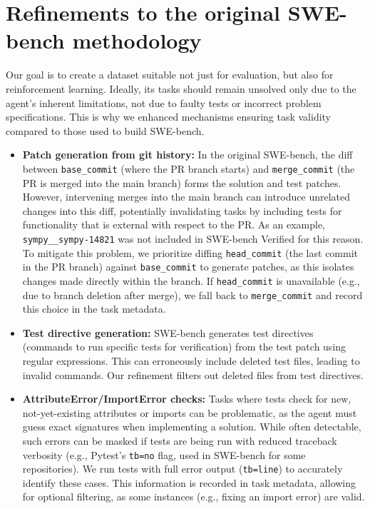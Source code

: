 \documentclass[dandb]{article}
\begin{document}
\section{Refinements to the original SWE-bench methodology}
\label{sec:list_of_refinements}

Our goal is to create a dataset suitable not just for evaluation, but also for reinforcement learning. Ideally, its tasks should remain unsolved only due to the agent's inherent limitations, not due to faulty tests or incorrect problem specifications. This is why we enhanced mechanisms ensuring task validity compared to those used to build SWE-bench.

\begin{itemize}
    \item \textbf{Patch generation from git history:} In the original SWE-bench, the diff between \verb|base_commit| (where the PR branch starts) and \verb|merge_commit| (the PR is merged into the main branch) forms the solution and test patches. However, intervening merges into the main branch can introduce unrelated changes into this diff, potentially invalidating tasks by including tests for functionality that is external with respect to the PR. As an example, \texttt{sympy\_\_sympy-14821} was not included in SWE-bench Verified for this reason. To mitigate this problem, we prioritize diffing \verb|head_commit| (the last commit in the PR branch) against \verb|base_commit| to generate patches, as this isolates changes made directly within the branch. If \verb|head_commit| is unavailable (e.g., due to branch deletion after merge), we fall back to \verb|merge_commit| and record this choice in the task metadata.

    \item \textbf{Test directive generation:} SWE-bench generates test directives (commands to run specific tests for verification) from the test patch using regular expressions. This can erroneously include deleted test files, leading to invalid commands. Our refinement filters out deleted files from test directives.

    \item \textbf{AttributeError/ImportError checks:} Tasks where tests check for new, not-yet-existing attributes or imports can be problematic, as the agent must guess exact signatures when implementing a solution. While often detectable, such errors can be masked if tests are being run with reduced traceback verbosity (e.g., Pytest's \texttt{tb=no} flag, used in SWE-bench for some repositories). We run tests with full error output (\texttt{tb=line}) to accurately identify these cases. This information is recorded in task metadata, allowing for optional filtering, as some instances (e.g., fixing an import error) are valid.


\end{itemize}
\end{document}

